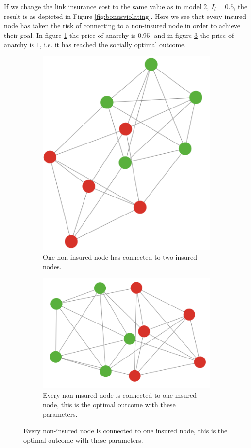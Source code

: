 If we change the link insurance cost to the same value as in model 2, $I_{l}=0.5$, the result is  as depicted in Figure \ref{fig:bonusviolating}. Here we see that every insured node has taken the risk of connecting to a non-insured node in order to achieve their goal. 
In figure \ref{fig:bonusvolating:a} the price of anarchy is $0.95$, and in figure \ref{fig:bonusvolating:b} the price of anarchy is $1$, i.e. it has reached the socially optimal outcome.
\begin{figure}[t]
\centering
\begin{subfigure}{.5\textwidth}
  \centering
  \includegraphics[width=0.9\linewidth]{../Figures/BonusGameViolating.png}
  \caption{\label{fig:bonusvolating:a} One non-insured node has connected to two insured nodes.}
\end{subfigure}
\quad
\begin{subfigure}{.5\textwidth}
  \centering
  \includegraphics[width=0.9\linewidth]{../Figures/BonusGameViolatingOptimal.png}
  \caption{\label{fig:bonusvolating:b}Every non-insured node is connected to one insured node, this is the optimal outcome with these parameters.}
\end{subfigure}
  

\end{figure}

